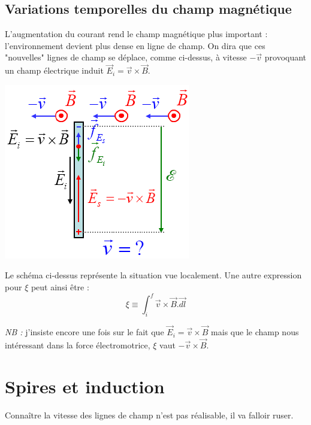 \documentclass	[11pt, a4paper, openany]{book}
\begin{document}
\subsection{Variations temporelles du champ magnétique}
L'augmentation du courant rend le champ magnétique plus important : l'environnement devient plus dense en ligne de champ. On dira que ces "nouvelles" lignes de champ se déplace, comme ci-dessus, à vitesse $-\vec{v}$ provoquant un champ électrique induit $\vec{E}_i = \vec{v} \times \vec{B}$.
\begin{center}
	\includegraphics[scale=0.45]{em/image7.png}\\
\end{center}
Le schéma ci-dessus représente la situation vue localement. Une autre expression pour $\xi$ peut ainsi être :
\begin{equation}
	\xi \equiv \int_i^f \vec{v} \times \vec{B}.\vec{dl}
\end{equation}


\textit{NB :} j'insiste encore une fois sur le fait que $\vec{E}_i = \vec{v} \times \vec{B}$ mais que le champ nous intéressant dans la force électromotrice, $\xi$ vaut $-\vec{v} \times \vec{B}$.


\section{Spires et induction}
Connaître la vitesse des lignes de champ n'est pas réalisable, il va falloir ruser.
\end{document}
